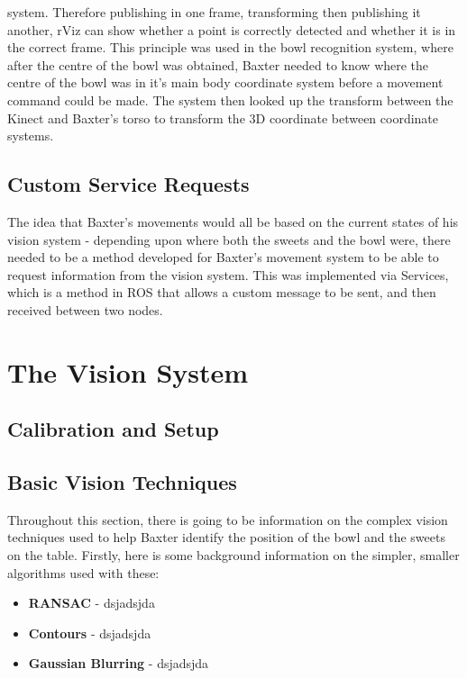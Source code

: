  system. Therefore publishing in one frame, transforming then publishing it another, rViz can show whether a point is correctly detected and whether it is in the correct frame.
\newline
This principle was used in the bowl recognition system, where after the centre of the bowl was obtained, Baxter needed to know where the centre of the bowl was in it's main body coordinate system before a movement command could be made. The system then looked up the transform between the Kinect and Baxter's torso to transform the 3D coordinate between coordinate systems.
\subsection{Custom Service Requests}
The idea that Baxter's movements would all be based on the current states of his vision system - depending upon where both the sweets and the bowl were, there needed to be a method developed for Baxter's movement system to be able to request information from the vision system. This was implemented via Services, which is a method in ROS that allows a custom message to be sent, and then received between two nodes.

\section{The Vision System}
\subsection{Calibration and Setup}
\subsection{Basic Vision Techniques}
Throughout this section, there is going to be information on the complex vision techniques used to help Baxter identify the position of the bowl and the sweets on the table. Firstly, here is some background information on the simpler, smaller algorithms used with these:
\begin{itemize}
\item{\textbf{RANSAC} - dsjadsjda}
\item{\textbf{Contours} - dsjadsjda}
\item{\textbf{Gaussian Blurring} - dsjadsjda}
\end{itemize}

